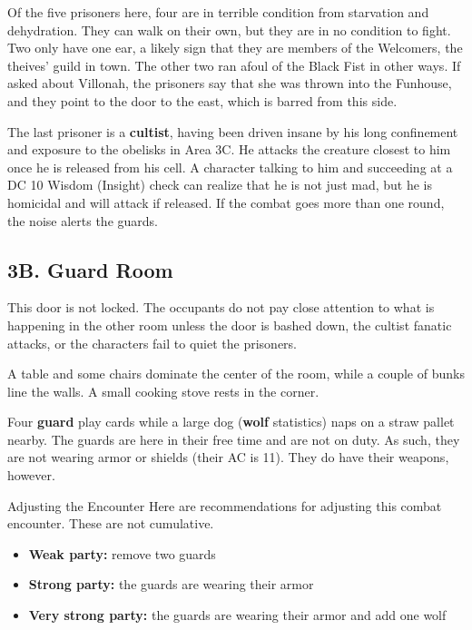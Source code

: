 \documentclass[10pt,a4paper,twoside,bg=print,twocolumn,openany,nodeprecatedcode]{dndbook}
\begin{document}
Of the five prisoners here, four are in terrible condition from starvation and dehydration. They can walk on their own, but they are in no condition to fight. Two only have one ear, a likely sign that they are members of the Welcomers, the theives' guild in town. The other two ran afoul of the Black Fist in other ways. If asked about Villonah, the prisoners say that she was thrown into the Funhouse, and they point to the door to the east, which is barred from this side.

The last prisoner is a \textbf{cultist}, having been driven insane by his long confinement and exposure to the obelisks in Area 3C. He attacks the creature closest to him once he is released from his cell. A character talking to him and succeeding at a DC 10 Wisdom (Insight) check can realize that he is not just mad, but he is homicidal and will attack if released. If the combat goes more than one round, the noise alerts the guards.

\subsection{3B. Guard Room}
This door is not locked. The occupants do not pay close attention to what is happening in the other room unless the door is bashed down, the cultist fanatic attacks, or the characters fail to quiet the prisoners.

\begin{DndReadAloud}{}
A table and some chairs dominate the center of the room, while a couple of bunks line the walls. A small cooking stove rests in the corner.

\end{DndReadAloud}

Four \textbf{guard} play cards while a large dog (\textbf{wolf} statistics) naps on a straw pallet nearby. The guards are here in their free time and are not on duty. As such, they are not wearing armor or shields (their AC is 11). They do have their weapons, however.

\begin{DndSidebar}[float=!b]{Adjusting the Encounter}
Here are recommendations for adjusting this combat encounter. These are not cumulative.




\begin{itemize}
\item \textbf{Weak party:} remove two guards
\item \textbf{Strong party:} the guards are wearing their armor
\item \textbf{Very strong party:} the guards are wearing their armor and add one wolf
\end{itemize}



\end{DndSidebar}
\end{document}
